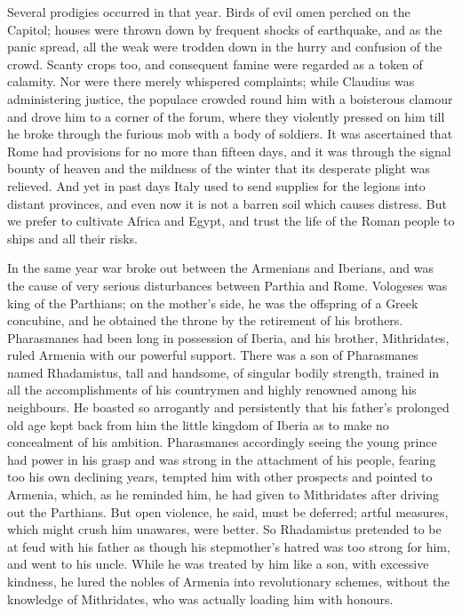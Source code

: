 
Several prodigies occurred in that year. Birds of evil omen perched on the Capitol; houses were thrown down by frequent shocks of earthquake, and as the panic spread, all the weak were trodden down in the hurry and confusion of the crowd. Scanty crops too, and consequent famine were regarded as a token of calamity. Nor were there merely whispered complaints; while Claudius was administering justice, the populace crowded round him with a boisterous clamour and drove him to a corner of the forum, where they violently pressed on him till he broke through the furious mob with a body of soldiers. It was ascertained that Rome had provisions for no more than fifteen days, and it was through the signal bounty of heaven and the mildness of the winter that its desperate plight was relieved. And yet in past days Italy used to send supplies for the legions into distant provinces, and even now it is not a barren soil which causes distress. But we prefer to cultivate Africa and Egypt, and trust the life of the Roman people to ships and all their risks.


In the same year war broke out between the Armenians and Iberians, and was the cause of very serious disturbances between Parthia and Rome. Vologeses was king of the Parthians; on the mother's side, he was the offspring of a Greek concubine, and he obtained the throne by the retirement of his brothers. Pharasmanes had been long in possession of Iberia, and his brother, Mithridates, ruled Armenia with our powerful support. There was a son of Pharasmanes named Rhadamistus, tall and handsome, of singular bodily strength, trained in all the accomplishments of his countrymen and highly renowned among his neighbours. He boasted so arrogantly and persistently that his father's prolonged old age kept back from him the little kingdom of Iberia as to make no concealment of his ambition. Pharasmanes accordingly seeing the young prince had power in his grasp and was strong in the attachment of his people, fearing too his own declining years, tempted him with other prospects and pointed to Armenia, which, as he reminded him, he had given to Mithridates after driving out the Parthians. But open violence, he said, must be deferred; artful measures, which might crush him unawares, were better. So Rhadamistus pretended to be at feud with his father as though his stepmother's hatred was too strong for him, and went to his uncle. While he was treated by him like a son, with excessive kindness, he lured the nobles of Armenia into revolutionary schemes, without the knowledge of Mithridates, who was actually loading him with honours.


